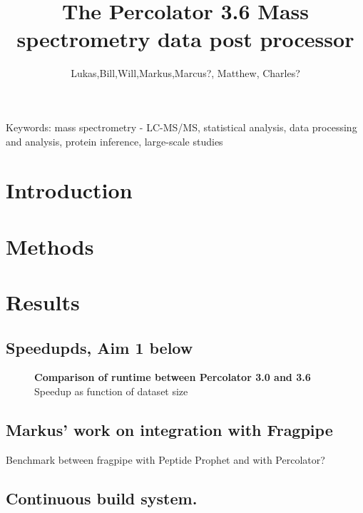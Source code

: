 \documentclass{article}
\title{The Percolator 3.6 Mass spectrometry data post processor}
\author{Lukas,Bill,Will,Markus,Marcus?, Matthew, Charles?}
\begin{document}
\maketitle

\doublespacing

Keywords: mass spectrometry - LC-MS/MS, statistical analysis, 
data processing and analysis, protein inference, large-scale studies


\newpage

\begin{abstract} 

\end{abstract}

\newpage


\section*{Introduction}


\section*{Methods}



\section*{Results}

\subsection*{Speedupds, Aim 1 below}

\begin{figure}
  \begin{center}
   \caption{\label{fig:x}\textbf{Comparison of runtime between Percolator 3.0 and 3.6} Speedup as function of dataset size }
  \end{center}
  \end{figure}
  
  \subsection*{Markus' work on integration with Fragpipe}

  Benchmark between fragpipe with Peptide Prophet and with Percolator?

  \subsection*{Continuous build system.} 
\end{document}
